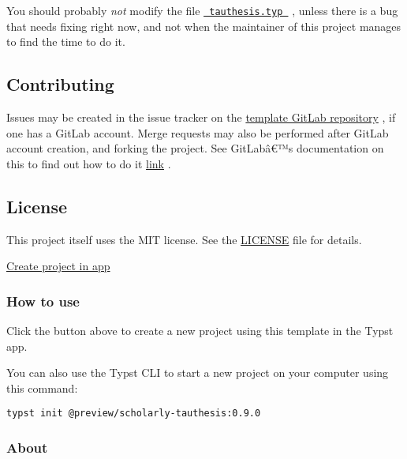You should probably \emph{not} modify the file
\href{https://github.com/typst/packages/raw/main/packages/preview/scholarly-tauthesis/0.9.0/tauthesis.typ}{\texttt{\ tauthesis.typ\ }}
, unless there is a bug that needs fixing right now, and not when the
maintainer of this project manages to find the time to do it.

\subsection{Contributing}\label{contributing}

Issues may be created in the issue tracker on the
\href{https://gitlab.com/tuni-official/thesis-templates/tau-typst-thesis-template}{template
GitLab repository} , if one has a GitLab account. Merge requests may
also be performed after GitLab account creation, and forking the
project. See GitLabâ€™s documentation on this to find out how to do it
\href{https://docs.gitlab.com/ee/user/project/repository/forking_workflow.html}{link}
.

\subsection{License}\label{license}

This project itself uses the MIT license. See the
\href{https://github.com/typst/packages/raw/main/packages/preview/scholarly-tauthesis/0.9.0/LICENSE}{LICENSE}
file for details.

\href{/app?template=scholarly-tauthesis&version=0.9.0}{Create project in
app}

\subsubsection{How to use}\label{how-to-use}

Click the button above to create a new project using this template in
the Typst app.

You can also use the Typst CLI to start a new project on your computer
using this command:

\begin{verbatim}
typst init @preview/scholarly-tauthesis:0.9.0
\end{verbatim}



\subsubsection{About}\label{about}


